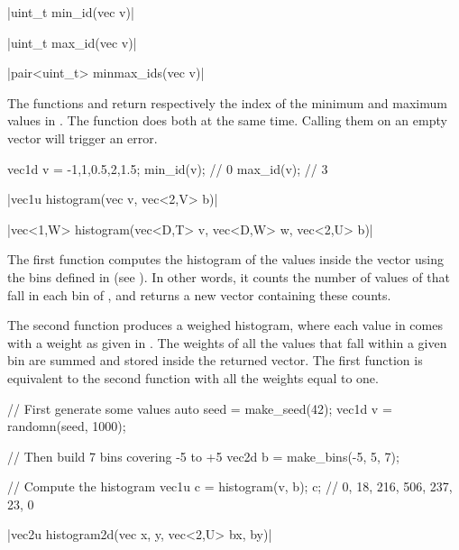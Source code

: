 \funcitem \cppinline|uint_t min_id(vec v)| 

\cppinline|uint_t max_id(vec v)| 

\cppinline|pair<uint_t> minmax_ids(vec v)| 

The functions  and  return respectively the index of the minimum and maximum values in . The function  does both at the same time. Calling them on an empty vector will trigger an error.

\begin{example}
\begin{cppcode}
vec1d v = {-1,1,0.5,2,1.5};
min_id(v); // 0
max_id(v); // 3
\end{cppcode}
\end{example}

\funcitem \cppinline|vec1u histogram(vec v, vec<2,V> b)| 

\cppinline|vec<1,W> histogram(vec<D,T> v, vec<D,W> w, vec<2,U> b)|

The first  function computes the histogram of the values inside the vector  using the bins defined in  (see ). In other words, it counts the number of values of  that fall in each bin of , and returns a new vector containing these counts.

The second  function produces a weighed histogram, where each value in  comes with a weight as given in . The weights of all the values that fall within a given bin are summed and stored inside the returned vector. The first function is equivalent to the second function with all the weights equal to one.

\begin{example}
\begin{cppcode}
// First generate some values
auto seed = make_seed(42);
vec1d v = randomn(seed, 1000);

// Then build 7 bins covering -5 to +5
vec2d b = make_bins(-5, 5, 7);

// Compute the histogram
vec1u c = histogram(v, b);
c; // {0, 18, 216, 506, 237, 23, 0}
\end{cppcode}
\end{example}

\funcitem \cppinline|vec2u histogram2d(vec x, y, vec<2,U> bx, by)| 

